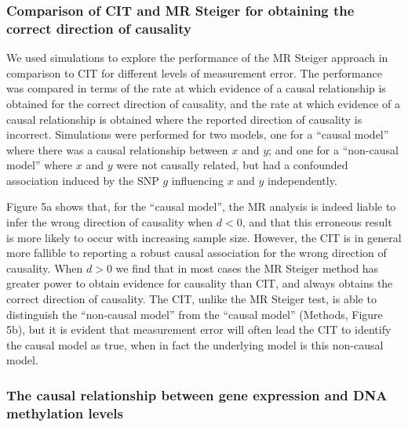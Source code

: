 \documentclass[]{article}
\begin{document}
\subsubsection{Comparison of CIT and MR Steiger for obtaining the
correct direction of
causality}\label{comparison-of-cit-and-mr-steiger-for-obtaining-the-correct-direction-of-causality}

We used simulations to explore the performance of the MR Steiger
approach in comparison to CIT for different levels of measurement error.
The performance was compared in terms of the rate at which evidence of a
causal relationship is obtained for the correct direction of causality,
and the rate at which evidence of a causal relationship is obtained
where the reported direction of causality is incorrect. Simulations were
performed for two models, one for a ``causal model'' where there was a
causal relationship between \(x\) and \(y\); and one for a ``non-causal
model'' where \(x\) and \(y\) were not causally related, but had a
confounded association induced by the SNP \(g\) influencing \(x\) and
\(y\) independently.

Figure 5a shows that, for the ``causal model'', the MR analysis is
indeed liable to infer the wrong direction of causality when \(d < 0\),
and that this erroneous result is more likely to occur with increasing
sample size. However, the CIT is in general more fallible to reporting a
robust causal association for the wrong direction of causality. When
\(d > 0\) we find that in most cases the MR Steiger method has greater
power to obtain evidence for causality than CIT, and always obtains the
correct direction of causality. The CIT, unlike the MR Steiger test, is
able to distinguish the ``non-causal model'' from the ``causal model''
(Methods, Figure 5b), but it is evident that measurement error will
often lead the CIT to identify the causal model as true, when in fact
the underlying model is this non-causal model.

\subsubsection{The causal relationship between gene expression and DNA
methylation
levels}\label{the-causal-relationship-between-gene-expression-and-dna-methylation-levels}
\end{document}
